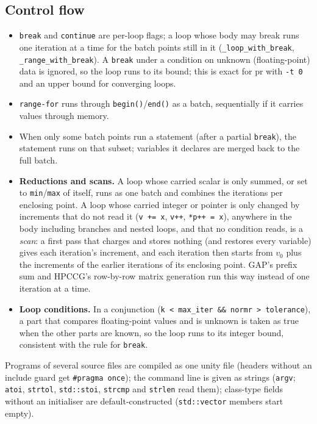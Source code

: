 \documentclass[11pt]{article}
\newcommand{\term}[1]{\emph{#1}}
\newcommand{\code}[1]{\texttt{#1}}
\begin{document}
\subsection{Control flow}
\begin{itemize}
\item \code{break} and \code{continue} are per-loop flags; a loop whose body may break runs one iteration at a time for
the batch points still in it (\code{\_loop\_with\_break}, \code{\_range\_with\_break}). A \code{break} under a
condition on unknown (floating-point) data is ignored, so the loop runs to its bound; this is exact for pr with
\code{-t 0} and an upper bound for converging loops.
\item \code{range-for} runs through \code{begin()}/\code{end()} as a batch, sequentially if it carries values
through memory.
\item When only some batch points run a statement (after a partial \code{break}), the statement runs on that subset;
variables it declares are merged back to the full batch.
\item \textbf{Reductions and scans.} A loop whose carried scalar is only summed, or set to \code{min}/\code{max} of
itself, runs as one batch and combines the iterations per enclosing point. A loop whose carried integer or pointer
is only changed by increments that do not read it (\code{v += x}, \code{v++}, \code{*p++ = x}), anywhere in the
body including branches and nested loops, and that no condition reads, is a \term{scan}: a first pass that charges
and stores nothing (and restores every variable) gives each iteration's increment, and each iteration then starts
from $v_0$ plus the increments of the earlier iterations of its enclosing point. GAP's prefix sum and HPCCG's
row-by-row matrix generation run this way instead of one iteration at a time.
\item \textbf{Loop conditions.} In a conjunction (\code{k < max\_iter \&\& normr > tolerance}), a part that compares
floating-point values and is unknown is taken as true when the other parts are known, so the loop runs to its
integer bound, consistent with the rule for \code{break}.
\end{itemize}

Programs of several source files are compiled as one unity file (headers without an include guard get
\code{\#pragma once}); the command line is given as strings (\code{argv}; \code{atoi}, \code{strtol},
\code{std::stoi}, \code{strcmp} and \code{strlen} read them); class-type fields without an initialiser are
default-constructed (\code{std::vector} members start empty).
\end{document}
